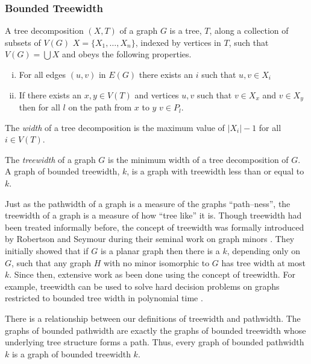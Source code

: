 \subsubsection{Bounded Treewidth}

\begin{definition}
    A tree decomposition $(X,T)$ of a graph $G$ is a tree, $T$, along a collection of subsets of $V(G)$ $X=\{X_1,\dots,X_n\}$, indexed by vertices in $T$, such that $V(G)=\bigcup X$ and obeys the following properties.    
    \begin{enumerate}[(i)]
        \item For all edges $(u,v)$ in $E(G)$ there exists an $i$ such that $u,v\in X_i$
        \item  If there exists an $x,y\in V(T)$ and vertices $u,v$ such that $v\in X_x$ and $v\in X_y$ then for all $l$ on the path from $x$ to $y$ $v\in P_l$.
    \end{enumerate} 
    The \textit{width} of a tree decomposition is the maximum value of $|X_i| -1$ for all $i\in V(T)$.
\end{definition}

\begin{definition}[Treewidth]
    The \textit{treewidth} of a graph $G$ is the minimum width of a tree decomposition of $G$.    
    A graph of bounded treewidth, $k$, is a graph with treewidth less than or equal to $k$. 
\end{definition}

Just as the pathwidth of a graph is a measure of the graphs ``path--ness'', the treewidth of a graph is a measure of how ``tree like'' it is. Though treewidth had been treated informally before, the concept of treewidth was formally introduced by Robertson and Seymour during their seminal work on graph minors \cite{robertson1986graphV}. They initially showed that if $G$ is a planar graph then there is a $k$, depending only on $G$, such that any graph $H$ with no minor isomorphic to $G$ has tree width at most $k$.  Since then, extensive work as been done using the concept of treewidth. For example, treewidth can be used to solve hard decision problems on graphs restricted to bounded tree width in polynomial time \cite{bodlaender1988dynamic}.

There is a relationship between our definitions of treewidth and pathwidth. The graphs of bounded pathwidth are exactly the graphs of bounded treewidth whose underlying tree structure forms a path. Thus, every graph of bounded pathwidth $k$ is a graph of bounded treewidth $k$. 

